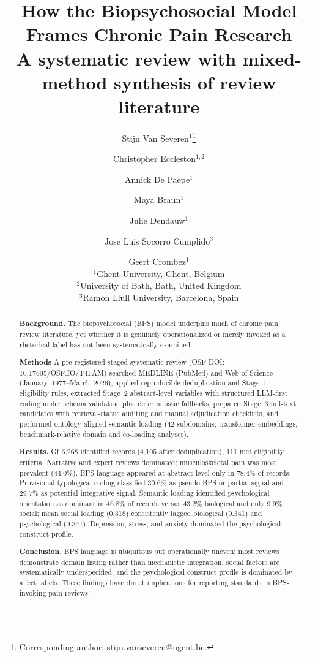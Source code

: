 \documentclass[11pt]{article}
\title{{\fontsize{24}{29}\selectfont\bfseries How the Biopsychosocial Model Frames Chronic Pain Research}\\[0.55em]
{\large A systematic review with mixed-method synthesis of review literature}}
\author{Stijn Van Severen$^{1}$\thanks{Corresponding author: \href{mailto:stijn.vanseveren@ugent.be}{stijn.vanseveren@ugent.be}.} \and
Christopher Eccleston$^{1,2}$ \and
Annick De Paepe$^{1}$ \and
Maya Braun$^{1}$ \and
Julie Dendauw$^{1}$ \and
Jose Luis Socorro Cumplido$^{3}$ \and
Geert Crombez$^{1}$\\[0.8em]
\normalsize $^{1}$Ghent University, Ghent, Belgium\\
\normalsize $^{2}$University of Bath, Bath, United Kingdom\\
\normalsize $^{3}$Ramon Llull University, Barcelona, Spain}
\date{}
\begin{document}
\maketitle
\onehalfspacing

\begin{abstract}
\noindent
\textbf{Background.} The biopsychosocial (BPS) model underpins much of chronic pain review literature, yet whether it is genuinely operationalized or merely invoked as a rhetorical label has not been systematically examined.

\smallskip\noindent
\textbf{Methods} A pre-registered staged systematic review (OSF DOI: 10.17605/OSF.IO/T4FAM) searched MEDLINE (PubMed) and Web of Science (January~1977--March~2026), applied reproducible deduplication and Stage~1 eligibility rules, extracted Stage~2 abstract-level variables with structured LLM-first coding under schema validation plus deterministic fallbacks, prepared Stage~3 full-text candidates with retrieval-status auditing and manual adjudication checklists, and performed ontology-aligned semantic loading (42 subdomains; transformer embeddings; benchmark-relative domain and co-loading analyses).

\smallskip\noindent
\textbf{Results.} Of 6,268 identified records (4,105 after deduplication), 111 met eligibility criteria. Narrative and expert reviews dominated; musculoskeletal pain was most prevalent (44.0\%). BPS language appeared at abstract level only in 78.4\% of records. Provisional typological coding classified 30.6\% as pseudo-BPS or partial signal and 29.7\% as potential integrative signal. Semantic loading identified psychological orientation as dominant in 46.8\% of records versus 43.2\% biological and only 9.9\% social; mean social loading (0.318) consistently lagged biological (0.341) and psychological (0.341). Depression, stress, and anxiety dominated the psychological construct profile.

\smallskip\noindent
\textbf{Conclusion.} BPS language is ubiquitous but operationally uneven: most reviews demonstrate domain listing rather than mechanistic integration, social factors are systematically underspecified, and the psychological construct profile is dominated by affect labels. These findings have direct implications for reporting standards in BPS-invoking pain reviews.
\end{abstract}

\clearpage

\end{document}
